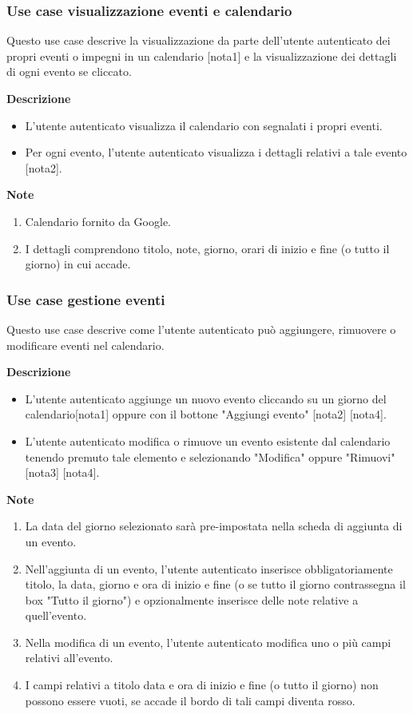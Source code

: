 \documentclass[a4paper,12pt]{article}
\begin{document}
\subsubsection*{Use case visualizzazione eventi e calendario}

Questo use case descrive la visualizzazione da parte dell'utente autenticato dei propri eventi o impegni in un calendario [nota1] e la visualizzazione dei dettagli di ogni evento se cliccato.

\textbf{Descrizione}
\begin{itemize} \setlength\itemsep{0.01em}
\item L'utente autenticato visualizza il calendario con segnalati i propri eventi.
\item Per ogni evento, l'utente autenticato visualizza i dettagli relativi a tale evento [nota2].
\end{itemize}

\textbf{Note}
\begin{enumerate} \setlength\itemsep{0.01em}
\item Calendario fornito da Google.
\item I dettagli comprendono titolo, note, giorno, orari di inizio e fine (o tutto il giorno) in cui accade.
\end{enumerate}

\subsubsection*{Use case gestione eventi}

Questo use case descrive come l'utente autenticato può aggiungere, rimuovere o modificare eventi nel calendario.


\textbf{Descrizione}
\begin{itemize} \setlength\itemsep{0.01em}
\item L'utente autenticato aggiunge un nuovo evento cliccando su un giorno del calendario[nota1] oppure con il bottone "Aggiungi evento" [nota2] [nota4].
\item L'utente autenticato modifica o rimuove un evento esistente dal calendario tenendo premuto tale elemento e selezionando "Modifica" oppure "Rimuovi" [nota3] [nota4].
\end{itemize}

\textbf{Note}
\begin{enumerate} \setlength\itemsep{0.01em}
\item La data del giorno selezionato sarà pre-impostata nella scheda di aggiunta di un evento.
\item Nell'aggiunta di un evento, l'utente autenticato inserisce obbligatoriamente titolo, la data, giorno e ora di inizio e fine (o se tutto il giorno contrassegna il box "Tutto il giorno") e opzionalmente inserisce delle note relative a quell'evento.
\item Nella modifica di un evento, l'utente autenticato modifica uno o più campi relativi all'evento.
\item I campi relativi a titolo data e ora di inizio e fine (o tutto il giorno) non possono essere vuoti, se accade il bordo di tali campi diventa rosso.
\end{enumerate}
\end{document}
